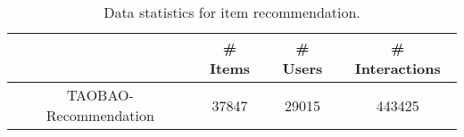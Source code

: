 \begin{table}[!hbpt]
    \centering
    \caption{Data statistics for item recommendation.}
    \begin{tabular}{c |c|c | c }
    \toprule
         & \# Items & \# Users & \# Interactions \\
         \midrule
        TAOBAO-Recommendation  & 37847 & 29015 & 443425 \\
    \bottomrule
    \end{tabular}
    \label{tab:taobao-recommendation-statistics}
\end{table}